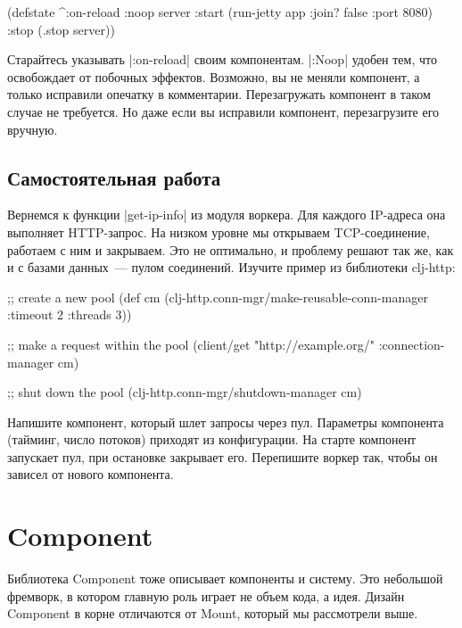 \begin{english}
  \begin{clojure}
(defstate ^{:on-reload :noop} server
  :start (run-jetty app {:join? false :port 8080})
  :stop (.stop server))
  \end{clojure}
\end{english}

Старайтесь указывать \spverb|:on-reload| своим компонентам. \spverb|:Noop|
удобен тем, что освобождает от побочных эффектов. Возможно, вы не меняли
компонент, а только исправили опечатку в комментарии. Перезагружать компонент в
таком случае не требуется. Но даже если вы исправили компонент, перезагрузите
его вручную.

\subsection{Самостоятельная работа}

Вернемся к функции \spverb|get-ip-info| из модуля воркера. Для каждого IP-адреса
она выполняет HTTP-запрос. На низком уровне мы открываем TCP-соединение,
работаем с ним и закрываем. Это не оптимально, и проблему решают так же, как и с
базами данных~--- пулом соединений. Изучите пример из библиотеки
clj-http:

\begin{english}
  \begin{clojure}
;; create a new pool
(def cm (clj-http.conn-mgr/make-reusable-conn-manager
         {:timeout 2 :threads 3}))

;; make a request within the pool
(client/get "http://example.org/"
            {:connection-manager cm})

;; shut down the pool
(clj-http.conn-mgr/shutdown-manager cm)
  \end{clojure}
\end{english}

Напишите компонент, который шлет запросы через пул. Параметры компонента
(тайминг, число потоков) приходят из конфигурации. На старте компонент запускает
пул, при остановке закрывает его. Перепишите воркер так, чтобы он зависел от
нового компонента.

\section{Component}

Библиотека Component
тоже описывает компоненты и систему. Это небольшой фремворк, в котором главную
роль играет не объем кода, а идея. Дизайн Component в корне отличаются
от Mount, который мы рассмотрели выше.

